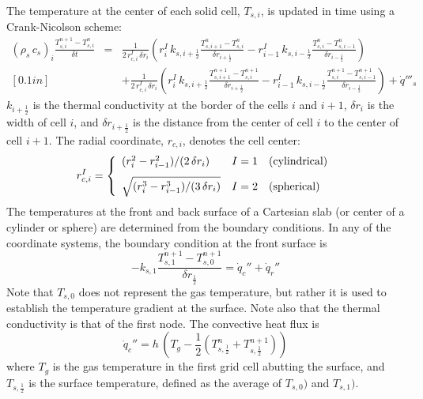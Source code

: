 The temperature at the center of each solid cell, $T_{s,i}$, is updated in time using a Crank-Nicolson scheme:
\begin{eqnarray}
\label{crank-nicolson}
(\rho_s \, c_s)_i \frac{T_{s,i}^{n+1}-T_{s,i}^{n}}{\delta t}
& = & \frac{1}{2 \, r_{c,i}^I \, \delta r_i} \left( r_{i}^{I} \, k_{s,i+\frac{1}{2}} \frac{T_{s,i+1}^{n}-T_{s,i}^{n}}{\delta r_{i+\frac{1}{2}}} - r_{i-1}^{I} \, k_{s,i-\frac{1}{2}} \frac{T_{s,i}^{n}-T_{s,i-1}^{n}}{\delta r_{i-\frac{1}{2}}} \right) \nonumber \\ [0.1in]
& & +\frac{1}{2 \, r_{c,i}^I \, \delta r_i} \left( r_{i}^{I} \, k_{s,i+\frac{1}{2}} \frac{T_{s,i+1}^{n+1}-T_{s,i}^{n+1}}{\delta r_{i+\frac{1}{2}}} - r_{i-1}^{I} \, k_{s,i-\frac{1}{2}} \frac{T_{s,i}^{n+1}-T_{s,i-1}^{n+1}}{\delta r_{i-\frac{1}{2}}} \right) + \dot{q}'''_s
\end{eqnarray}
$k_{i+\frac{1}{2}}$ is the thermal conductivity at the border of the cells $i$ and $i+1$, $\delta r_i$ is the width of cell $i$, and  $\delta r_{i+\frac{1}{2}}$ is the distance from the center of cell $i$ to the center of cell $i+1$. The radial coordinate, $r_{c,i}$, denotes the cell center:
\begin{equation}
r_{c,i}^I = \left\{
\begin{array}{ll} (r_i^2 - r_{i-1}^2)/(2 \, \delta r_i)            & I=1 \quad \hbox{(cylindrical)} \\ [0.1in]
                   \sqrt{ ( r_i^3 - r_{i-1}^3)/(3 \, \delta r_i) } & I=2 \quad \hbox{(spherical)}
\end{array} \right.
\end{equation}
The temperatures at the front and back surface of a Cartesian slab (or center of a cylinder or sphere) are determined from the boundary conditions. In any of the coordinate systems, the boundary condition at the front surface is
\begin{equation}
\label{bc_front}
 -k_{s,1} \frac{T_{s,1}^{n+1}-T_{s,0}^{n+1}}{\delta r_{\frac{1}{2}}}
  =  \dot{q}_{c}''+\dot{q}_{r}''
\end{equation}
Note that $T_{s,0}$ does not represent the gas temperature, but rather it is used to establish the temperature gradient at the surface. Note also that the thermal conductivity is that of the first node. The convective heat flux is
\begin{equation}
\label{conv}
  \dot{q}_c'' = h \, \left( T_g - \frac{1}{2} \left( T_{s,\frac{1}{2}}^n+T_{s,\frac{1}{2}}^{n+1} \right) \right)
\end{equation}
where $T_g$ is the gas temperature in the first grid cell abutting the surface, and $T_{s,\frac{1}{2}}$ is the surface temperature, defined as the average of $T_{s,0})$ and $T_{s,1})$.

